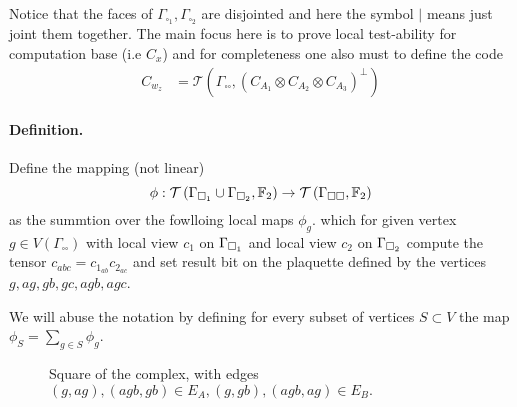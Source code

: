 \documentclass{article}
\begin{document}
\begin{multicols*}{2}
\begin{equation*}
\begin{split}
	  \end{split}
	\end{equation*}
	Notice that the faces of $\Gamma_{\square_{1}},\Gamma_{\square_{2}}$ are disjointed and here the symbol $|$ means just joint them together. 
	The main focus here is to prove local test-ability for computation base (i.e $C_{x}$) and for completeness one also must to define the code 
	\begin{equation*}
	  \begin{split}
	    C_{w_{z}} &=  \mathcal{T}\left( \Gamma_{\square \square}, \left(  C_{A_1} \otimes C_{A_2} \otimes C_{A_3} \right)^{\perp}  \right)   
	  \end{split}
	\end{equation*}
	\paragraph{Definition.} Define the mapping (not linear)  
	\begin{equation*}	
	\phi : \mathcal{T}\left(\Gamma_{\square_{1}} \cup \Gamma_{\square_{2}} , \mathbb{F}_2  \right) \rightarrow  \mathcal{T}\left( \Gamma_{\square \square}, \mathbb{F}_{2} \right)
      \end{equation*} 
      as the summtion over the fowlloing local maps $\phi_{g}$. which for given vertex $g \in V\left( \Gamma_{\square \square}\right)$ with local view $c_1$ on $\Gamma_{\square_{1}}$ and local view $c_2$ on $\Gamma_{\square_{2}}$ compute the tensor $c_{abc} = c_{1_{ab}}c_{2_{ac}}$ and set result bit on the plaquette defined by the vertices $ g, ag, gb, gc, agb, agc$.    

      We will abuse the notation by defining for every subset of vertices $S \subset V $  the map $\phi_S = \sum_{g \in S} \phi_{g}$. 

      \begin{figure}[H]
\begin{center}
\end{center}
\caption{Square of the complex, with edges $(g,ag), (agb, gb) \in E_A,
(g,gb), (agb, ag) \in E_B.$ \label{fig:square}
}
\end{figure}


\end{multicols*}
\end{document}
